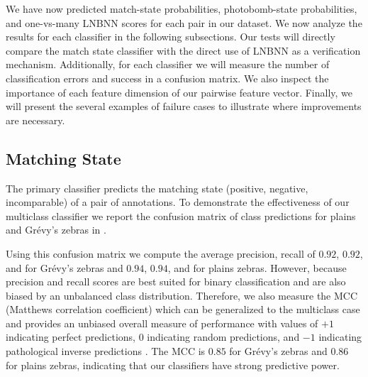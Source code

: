    We have now predicted match-state probabilities, photobomb-state
      probabilities, and one-vs-many LNBNN scores for each pair in our dataset.
    We now analyze the results for each classifier in the following
      subsections.
    Our tests will directly compare the match state classifier with the direct
      use of LNBNN as a verification mechanism.
    Additionally, for each classifier we will measure the number of
      classification errors and success in a confusion matrix.
    We also inspect the importance of each feature dimension of our pairwise
      feature vector.
    Finally, we will present the several examples of failure cases to
      illustrate where improvements are necessary.




    \subsection{Matching State}

        The primary classifier predicts the matching state (positive,
          negative, incomparable) of a pair of annotations.
        To demonstrate the effectiveness of our multiclass classifier we
          report the confusion matrix of class predictions for plains and
          Grévy's zebras in .

        \MatchConfusion{}

        Using this confusion matrix we compute the average precision, recall
          of $0.92$, $0.92$, and for Grévy's zebras and $0.94$, $0.94$, and for
          plains zebras.
        However, because precision and recall scores are best suited for
          binary classification and are also biased by an unbalanced class
          distribution.
        Therefore, we also measure the MCC (Matthews correlation coefficient)
          which can be generalized to the multiclass case and provides an
          unbiased overall measure of performance with values of $+1$ indicating
          perfect predictions, $0$ indicating random predictions, and $-1$
          indicating pathological inverse predictions
          \cite{powers_evaluation_2011}.
        The MCC is $0.85$ for Grévy's zebras and $0.86$ for plains zebras,
          indicating that our classifiers have strong predictive power.
        

